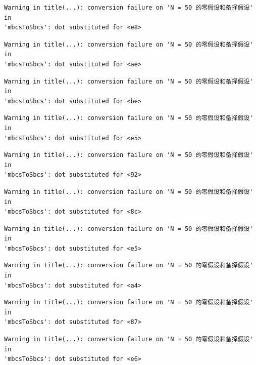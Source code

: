 \documentclass[
  letterpaper,
  DIV=11,
  numbers=noendperiod]{scrreprt}
\begin{document}
\begin{verbatim}
Warning in title(...): conversion failure on 'N = 50 的零假设和备择假设' in
'mbcsToSbcs': dot substituted for <e8>
\end{verbatim}

\begin{verbatim}
Warning in title(...): conversion failure on 'N = 50 的零假设和备择假设' in
'mbcsToSbcs': dot substituted for <ae>
\end{verbatim}

\begin{verbatim}
Warning in title(...): conversion failure on 'N = 50 的零假设和备择假设' in
'mbcsToSbcs': dot substituted for <be>
\end{verbatim}

\begin{verbatim}
Warning in title(...): conversion failure on 'N = 50 的零假设和备择假设' in
'mbcsToSbcs': dot substituted for <e5>
\end{verbatim}

\begin{verbatim}
Warning in title(...): conversion failure on 'N = 50 的零假设和备择假设' in
'mbcsToSbcs': dot substituted for <92>
\end{verbatim}

\begin{verbatim}
Warning in title(...): conversion failure on 'N = 50 的零假设和备择假设' in
'mbcsToSbcs': dot substituted for <8c>
\end{verbatim}

\begin{verbatim}
Warning in title(...): conversion failure on 'N = 50 的零假设和备择假设' in
'mbcsToSbcs': dot substituted for <e5>
\end{verbatim}

\begin{verbatim}
Warning in title(...): conversion failure on 'N = 50 的零假设和备择假设' in
'mbcsToSbcs': dot substituted for <a4>
\end{verbatim}

\begin{verbatim}
Warning in title(...): conversion failure on 'N = 50 的零假设和备择假设' in
'mbcsToSbcs': dot substituted for <87>
\end{verbatim}

\begin{verbatim}
Warning in title(...): conversion failure on 'N = 50 的零假设和备择假设' in
'mbcsToSbcs': dot substituted for <e6>
\end{verbatim}
\end{document}
